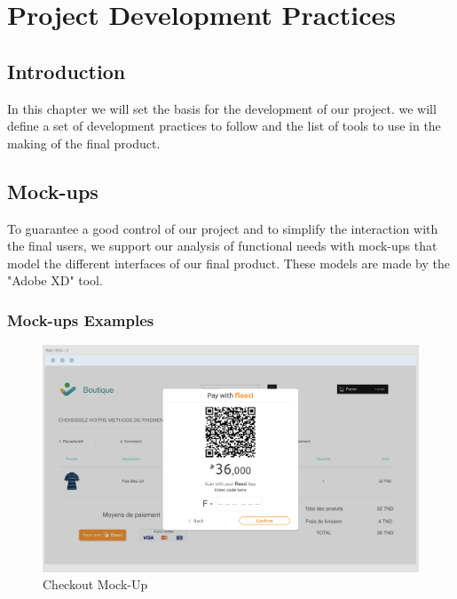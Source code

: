 
\setcounter{chapter}{1}
\chapter{Project Development Practices}
\minitoc %
\graphicspath{{Chapter2/figures/}}


\pagestyle{fancy}
\fancyhf{}
\fancyhead[R]{\bfseries\rightmark}
\fancyfoot[R]{\thepage}
\renewcommand{\headrulewidth}{0.5pt}
\renewcommand{\footrulewidth}{0pt}
\renewcommand{\chaptermark}[1]{\markboth{\MakeUppercase{\chaptername~\thechapter. #1 }}{}}
\renewcommand{\sectionmark}[1]{\markright{\thechapter.\thesection~ #1}}

\begin{spacing}{1.2}
\section*{Introduction}
In this chapter we will set the basis for the development of our project. we will define a set of development practices to follow and the list of tools to use in the making of the final product.
\section{Mock-ups}
To guarantee a good control of our project and to simplify the interaction with the final users, we support our analysis of functional needs with mock-ups that model the different interfaces of our final product. These models are made by the "Adobe XD" tool.
\subsection{Mock-ups Examples}
\begin{figure}[!h]\centering
\includegraphics[scale=0.4]{Checkout_screen}
\caption{Checkout Mock-Up}
\label{fig:fig1}
\end{figure}


\end{spacing}
